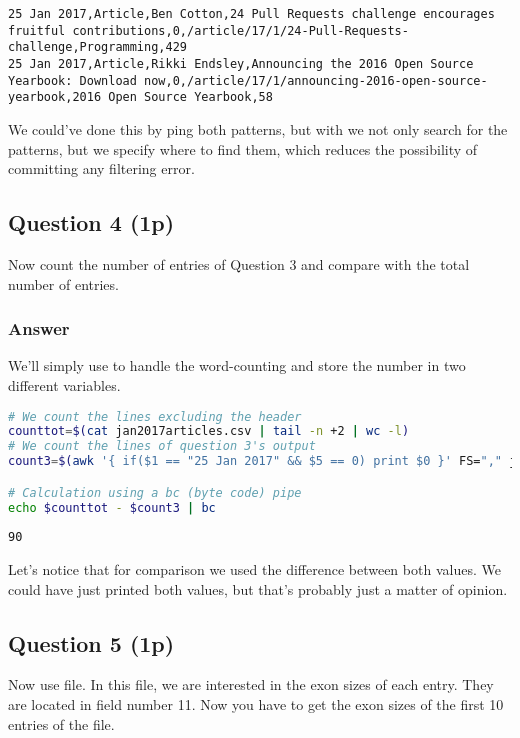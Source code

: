 \begin{lstlisting}[style=output]
25 Jan 2017,Article,Ben Cotton,24 Pull Requests challenge encourages fruitful contributions,0,/article/17/1/24-Pull-Requests-challenge,Programming,429
25 Jan 2017,Article,Rikki Endsley,Announcing the 2016 Open Source Yearbook: Download now,0,/article/17/1/announcing-2016-open-source-yearbook,2016 Open Source Yearbook,58
\end{lstlisting}

We could've done this by ping both patterns, but with  we not only search for the patterns, but we specify where to find them, which reduces the possibility of committing any filtering error.

\subsection*{Question 4 (1p)}
Now count the number of entries of Question 3 and compare with the total number of entries.

\subsubsection*{Answer}
We'll simply use  to handle the word-counting and store the number in two different variables.
\begin{lstlisting}[language=bash]
# We count the lines excluding the header
counttot=$(cat jan2017articles.csv | tail -n +2 | wc -l)
# We count the lines of question 3's output
count3=$(awk '{ if($1 == "25 Jan 2017" && $5 == 0) print $0 }' FS="," jan2017articles.csv | wc -l)

# Calculation using a bc (byte code) pipe
echo $counttot - $count3 | bc
\end{lstlisting}

\begin{lstlisting}[style=output]
90
\end{lstlisting}
Let's notice that for comparison we used the difference between both values. We could have just printed both values, but that's probably just a matter of opinion.

\subsection*{Question 5 (1p)}
Now use  file. In this file, we are interested in the exon sizes of each entry. They are located in field number 11. Now you have to get the exon sizes of the first 10 entries of the file.

